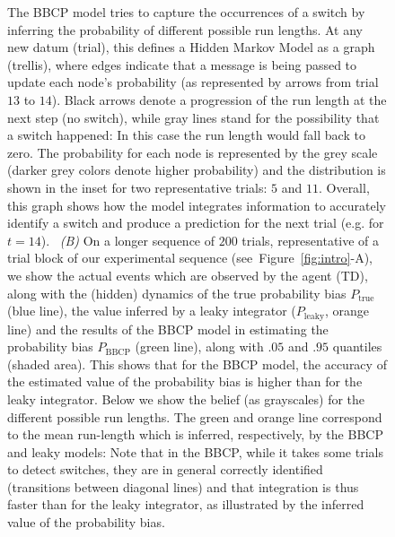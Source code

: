 \documentclass[10pt,letterpaper]{article}
\newcommand{\seeFig}[1]{Figure~\ref{fig:#1}}
\newcommand{\CP}[1]{\textbf{\textcolor{green}{[CP: #1]}}}
\begin{document}
\begin{figure}
{The BBCP model tries to capture the occurrences of a switch
by inferring the probability of different possible run lengths.
At any new datum (trial), this defines a Hidden Markov Model
as a graph (trellis), where %
edges indicate that a message is being passed
to update each node's probability (as represented by arrows from trial $13$ to $14$).
Black arrows denote a progression of the run length at the next step (no switch),
while gray lines stand for the possibility that a switch happened:
In this case the run length would fall back to zero.
The probability for each node is represented by the grey scale (darker grey colors denote higher probability)
and the distribution is shown in the inset for two representative trials: $5$ and $11$.
Overall, this graph shows how the model integrates information to accurately identify a switch
and produce a prediction for the next trial (e.g. for $t=14$).
~\textit{(B)} On a longer sequence of $200$ trials,
representative of a trial block of our experimental sequence (see~\seeFig{intro}-A), %
we show %
the actual events which are observed by the agent (TD),
along with the (hidden) dynamics of the true probability bias $P_{\text{true}}$ (blue line),
the value inferred by a leaky integrator ($P_{\text{leaky}}$, orange line)
and the results of the BBCP model
in estimating the probability bias $P_{\text{BBCP}}$ (green line),
along with $.05$ and $.95$ quantiles (shaded area).
This shows that for the BBCP model,
the accuracy of the estimated value of the probability bias
is higher than for the leaky integrator.
Below we show the belief (as grayscales) for the different possible run lengths.
The green and orange line correspond to the mean run-length which is inferred,
respectively, by the BBCP and leaky models:
Note that in the BBCP, while it takes some trials to detect switches,
they are in general correctly identified (transitions between diagonal lines) and
that integration is thus faster than for the leaky integrator,
as illustrated by the inferred value of the probability bias.
}
\label{fig:Bayesianchangepoint}
\end{figure}
\end{document}
